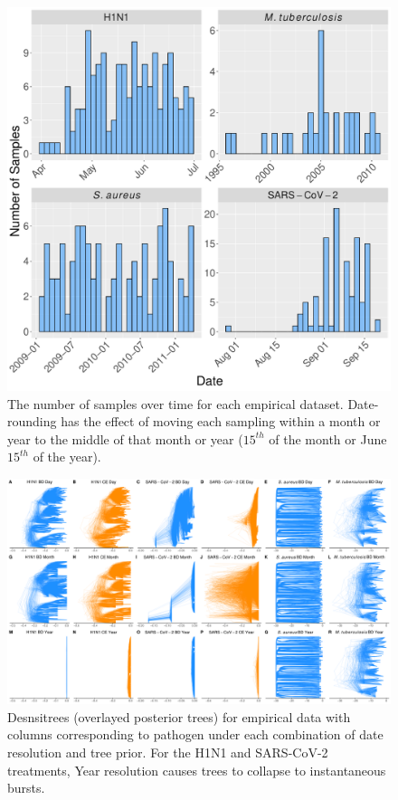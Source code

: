 \documentclass[12pt]{article}
\begin{document}
\begin{figure}[H]
    \centering
    \includegraphics[width=\textwidth]{figures/empirical_sampling_times.pdf}
    \caption{The number of samples over time for each empirical dataset. Date-rounding has the effect of moving each sampling within a month or year to the middle of that month or year ($15^{th}$ of the month or June $15^{th}$ of the year).}
    \label{fig:sampling}
\end{figure}

\begin{figure}[H]
    \centering
    \includegraphics[width=\textwidth]{empirical_densitrees.pdf}
    \caption{Desnsitrees (overlayed posterior trees) for empirical data with columns corresponding to pathogen under each combination of date resolution and tree prior. For the H1N1 and SARS-CoV-2 treatments, Year resolution causes trees to collapse to instantaneous bursts.}
    \label{fig:densitree}
\end{figure}
\end{document}
